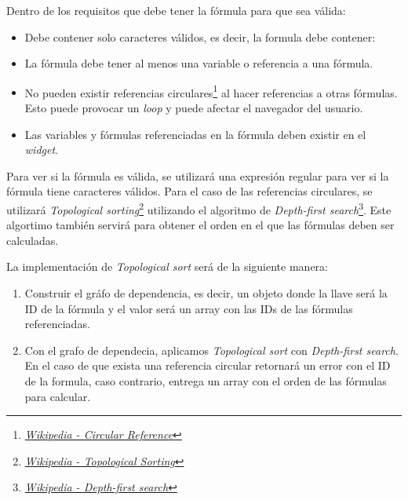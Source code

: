 Dentro de los requisitos que debe tener la fórmula para que sea válida:
\begin{itemize}
    \item Debe contener solo caracteres válidos, es decir, la formula debe contener:
    \item La fórmula debe tener al menos una variable o referencia a una fórmula.
    \item No pueden existir referencias circulares\footnote{\href{https://en.wikipedia.org/wiki/Circular_reference}{\textit{Wikipedia - Circular Reference}}} al hacer referencias a otras fórmulas. Esto puede provocar un \textit{loop} y puede afectar el navegador del usuario.
    \item Las variables y fórmulas referenciadas en la fórmula deben existir en el \textit{widget}.        
\end{itemize}

Para ver si la fórmula es válida, se utilizará una expresión regular para ver si la fórmula tiene caracteres válidos.
Para el caso de las referencias circulares, se utilizará \textit{Topological sorting}\footnote{\href{https://en.wikipedia.org/wiki/Topological_sorting}{\textit{Wikipedia - Topological Sorting}}} utilizando el algoritmo de \textit{Depth-first search}\footnote{\href{https://en.wikipedia.org/wiki/Depth-first_search}{\textit{Wikipedia - Depth-first search}}}.
Este algortimo también servirá para obtener el orden en el que las fórmulas deben ser calculadas.

La implementación de \textit{Topological sort} será de la siguiente manera:
\begin{enumerate}
    \item Construir el gráfo de dependencia, es decir, un objeto donde la llave será la ID de la fórmula y el valor será un array con las IDs de las fórmulas referenciadas.
    \item Con el grafo de dependecia, aplicamos \textit{Topological sort} con \textit{Depth-first search}. En el caso de que exista una referencia circular retornará un error con el ID de la formula, caso contrario, entrega un array con el orden de las fórmulas para calcular.
\end{enumerate}


